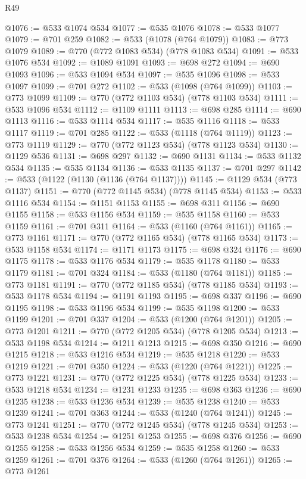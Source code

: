 \begin{lexlean}{R49}
\begin{coremodule}
@1076 := @533 @1074 @534
@1077 := @535 @1076
@1078 := @533 @1077
@1079 := @701 @259
@1082 := @533 (@1078 (@764 @1079))
@1083 := @773 @1079
@1089 := @770 (@772 @1083 @534) (@778 @1083 @534)
@1091 := @533 @1076 @534
@1092 := @1089 @1091
@1093 := @698 @272
@1094 := @690 @1093
@1096 := @533 @1094 @534
@1097 := @535 @1096
@1098 := @533 @1097
@1099 := @701 @272
@1102 := @533 (@1098 (@764 @1099))
@1103 := @773 @1099
@1109 := @770 (@772 @1103 @534) (@778 @1103 @534)
@1111 := @533 @1096 @534
@1112 := @1109 @1111
@1113 := @698 @285
@1114 := @690 @1113
@1116 := @533 @1114 @534
@1117 := @535 @1116
@1118 := @533 @1117
@1119 := @701 @285
@1122 := @533 (@1118 (@764 @1119))
@1123 := @773 @1119
@1129 := @770 (@772 @1123 @534) (@778 @1123 @534)
@1130 := @1129 @536
@1131 := @698 @297
@1132 := @690 @1131
@1134 := @533 @1132 @534
@1135 := @535 @1134
@1136 := @533 @1135
@1137 := @701 @297
@1142 := @533 (@1122 (@1130 (@1136 (@764 @1137))))
@1145 := @1129 @534 (@773 @1137)
@1151 := @770 (@772 @1145 @534) (@778 @1145 @534)
@1153 := @533 @1116 @534
@1154 := @1151 @1153
@1155 := @698 @311
@1156 := @690 @1155
@1158 := @533 @1156 @534
@1159 := @535 @1158
@1160 := @533 @1159
@1161 := @701 @311
@1164 := @533 (@1160 (@764 @1161))
@1165 := @773 @1161
@1171 := @770 (@772 @1165 @534) (@778 @1165 @534)
@1173 := @533 @1158 @534
@1174 := @1171 @1173
@1175 := @698 @324
@1176 := @690 @1175
@1178 := @533 @1176 @534
@1179 := @535 @1178
@1180 := @533 @1179
@1181 := @701 @324
@1184 := @533 (@1180 (@764 @1181))
@1185 := @773 @1181
@1191 := @770 (@772 @1185 @534) (@778 @1185 @534)
@1193 := @533 @1178 @534
@1194 := @1191 @1193
@1195 := @698 @337
@1196 := @690 @1195
@1198 := @533 @1196 @534
@1199 := @535 @1198
@1200 := @533 @1199
@1201 := @701 @337
@1204 := @533 (@1200 (@764 @1201))
@1205 := @773 @1201
@1211 := @770 (@772 @1205 @534) (@778 @1205 @534)
@1213 := @533 @1198 @534
@1214 := @1211 @1213
@1215 := @698 @350
@1216 := @690 @1215
@1218 := @533 @1216 @534
@1219 := @535 @1218
@1220 := @533 @1219
@1221 := @701 @350
@1224 := @533 (@1220 (@764 @1221))
@1225 := @773 @1221
@1231 := @770 (@772 @1225 @534) (@778 @1225 @534)
@1233 := @533 @1218 @534
@1234 := @1231 @1233
@1235 := @698 @363
@1236 := @690 @1235
@1238 := @533 @1236 @534
@1239 := @535 @1238
@1240 := @533 @1239
@1241 := @701 @363
@1244 := @533 (@1240 (@764 @1241))
@1245 := @773 @1241
@1251 := @770 (@772 @1245 @534) (@778 @1245 @534)
@1253 := @533 @1238 @534
@1254 := @1251 @1253
@1255 := @698 @376
@1256 := @690 @1255
@1258 := @533 @1256 @534
@1259 := @535 @1258
@1260 := @533 @1259
@1261 := @701 @376
@1264 := @533 (@1260 (@764 @1261))
@1265 := @773 @1261

\end{coremodule}
\end{lexlean}
